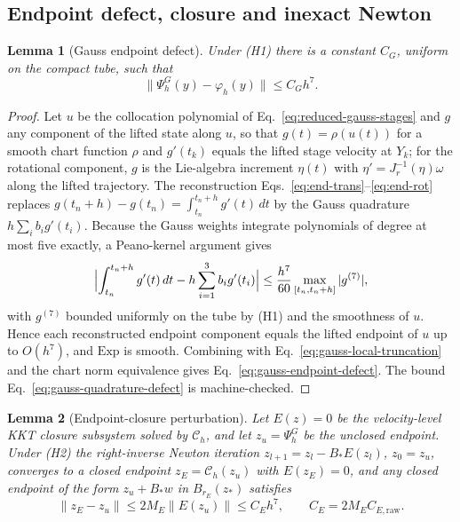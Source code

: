 \documentclass[preprint,12pt]{elsarticle}
\newtheorem{lemma}{Lemma}
\begin{document}
\subsection{Endpoint defect, closure and inexact Newton}

\begin{lemma}[Gauss endpoint defect]
\label{lem:gauss-endpoint-defect}
Under (H1) there is a constant $C_G$, uniform on the compact tube, such that
\begin{equation}
  \|\Psi_h^G(y)-\varphi_h(y)\|\le C_Gh^7 .
  \label{eq:gauss-endpoint-defect}
\end{equation}
\end{lemma}

\begin{proof}
Let $u$ be the collocation polynomial of Eq.~\eqref{eq:reduced-gauss-stages} and $g$ any
component of the lifted state along $u$, so that $g(t)=\rho(u(t))$ for a smooth chart function
$\rho$ and $g'(t_k)$ equals the lifted stage velocity at $Y_k$; for the rotational component, $g$
is the Lie-algebra increment $\eta(t)$ with $\eta'=J_r^{-1}(\eta)\omega$ along the lifted
trajectory. The reconstruction Eqs.~\eqref{eq:end-trans}--\eqref{eq:end-rot} replaces
$g(t_n+h)-g(t_n)=\int_{t_n}^{t_n+h}g'(t)\,dt$ by the Gauss quadrature $h\sum_ib_ig'(t_i)$. Because
the Gauss weights integrate polynomials of degree at most five exactly, a Peano-kernel argument
gives
\begin{equation}
  \Bigl|\int_{t_n}^{t_n+h}g'(t)\,dt-h\sum_{i=1}^3b_ig'(t_i)\Bigr|
  \le\frac{h^7}{60}\max_{[t_n,t_n+h]}|g^{(7)}| ,
  \label{eq:gauss-quadrature-defect}
\end{equation}
with $g^{(7)}$ bounded uniformly on the tube by (H1) and the smoothness of $u$. Hence each
reconstructed endpoint component equals the lifted endpoint of $u$ up to $O(h^7)$, and $\mathrm{Exp}$
is smooth. Combining with Eq.~\eqref{eq:gauss-local-truncation} and the chart norm equivalence gives
Eq.~\eqref{eq:gauss-endpoint-defect}. The bound Eq.~\eqref{eq:gauss-quadrature-defect} is
machine-checked.
\end{proof}

\begin{lemma}[Endpoint-closure perturbation]
\label{lem:endpoint-closure}
Let $E(z)=0$ be the velocity-level KKT closure subsystem solved by $\mathcal C_h$, and let
$z_u=\Psi_h^G$ be the unclosed endpoint. Under (H2) the right-inverse Newton iteration
$z_{l+1}=z_l-B_\ast E(z_l)$, $z_0=z_u$, converges to a closed endpoint $z_E=\mathcal C_h(z_u)$
with $E(z_E)=0$, and any closed endpoint of the form $z_u+B_\ast w$ in $B_{r_E}(z_\ast)$ satisfies
\begin{equation}
  \|z_E-z_u\|\le 2M_{E}\|E(z_u)\|\le C_Eh^7,\qquad C_E=2M_{E}C_{E,\mathrm{raw}} .
  \label{eq:endpoint-correction-bound}
\end{equation}
\end{lemma}
\end{document}
